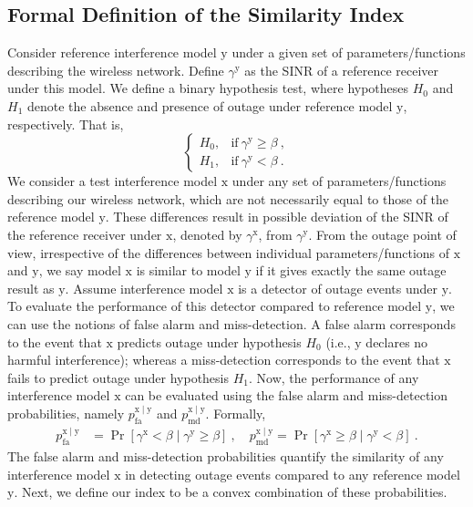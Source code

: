 \documentclass[12pt, draftclsnofoot, onecolumn]{IEEEtran}
\begin{document}
\subsection{Formal Definition of the Similarity Index}
Consider reference interference model $\mathrm{y}$ under a given set of parameters/functions describing the wireless network. Define $\gamma^{\mathrm{y}}$ as the SINR of a reference receiver under this model. We define a binary hypothesis test, where hypotheses $H_0$ and $H_1$ denote the absence and presence of outage under reference model $\mathrm{y}$, respectively. That is,
\begin{equation}\label{eq: binary-hypothesis-test}
\begin{cases}
  H_0, & \mbox{if}~ \gamma^{\mathrm{y}} \geq \beta \:,\\
  H_1, & \mbox{if}~ \gamma^{\mathrm{y}} < \beta \:.
\end{cases}
\end{equation}
We consider a test interference model $\mathrm{x}$ under any set of parameters/functions describing our wireless network, which are not necessarily equal to those of the reference model $\mathrm{y}$. These differences result in possible deviation of the SINR of the reference receiver under $\mathrm{x}$, denoted by $\gamma^{\mathrm{x}}$, from $\gamma^{\mathrm{y}}$. From the outage point of view, irrespective of the differences between individual parameters/functions of $\mathrm{x}$  and $\mathrm{y}$, we say model $\mathrm{x}$ is similar to model $\mathrm{y}$ if it gives exactly the same outage result as $\mathrm{y}$. Assume interference model $\mathrm{x}$ is a detector of outage events under $\mathrm{y}$. To evaluate the performance of this detector compared to reference model $\mathrm{y}$, we can use the notions of false alarm and miss-detection. A false alarm corresponds to the event that $\mathrm{x}$ predicts outage under hypothesis $H_0$ (i.e., $\mathrm{y}$ declares no harmful interference); whereas a miss-detection corresponds to the event that $\mathrm{x}$ fails to predict outage under hypothesis $H_1$. Now, the performance of any interference model $\mathrm{x}$ can be evaluated using the false alarm and miss-detection probabilities, namely $p_{\mathrm{fa}}^{\mathrm{x} \mid \mathrm{y}}$ and $p_{\mathrm{md}}^{\mathrm{x} \mid \mathrm{y}}$. Formally,
\begin{align}\label{eq: miss-detection-prob}
p_{\mathrm{fa}}^{\mathrm{x} \mid \mathrm{y}} &= \Pr \left[\gamma^{\mathrm{x}} < \beta \mid \gamma^{\mathrm{y}} \geq \beta \right] \:,
\quad p_{\mathrm{md}}^{\mathrm{x} \mid \mathrm{y}} = \Pr \left[\gamma^{\mathrm{x}} \geq \beta \mid \gamma^{\mathrm{y}} < \beta \right] \:.
\end{align}
The false alarm and miss-detection probabilities quantify the similarity of any interference model $\mathrm{x}$ in detecting outage events compared to any reference model $\mathrm{y}$. Next, we define our index to be a convex combination of these probabilities.
\end{document}
